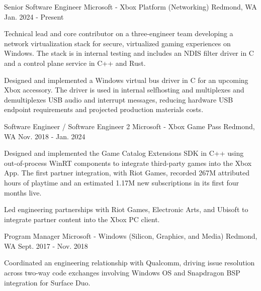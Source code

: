 

\begin{cventries}

  \cventry
    {Senior Software Engineer} %
    {Microsoft - Xbox Platform (Networking)} %
    {Redmond, WA} %
    {Jan. 2024 - Present} %
    {
      \begin{cvitems}
        \item{Technical lead and core contributor on a three-engineer team developing a network virtualization stack for secure, virtualized gaming experiences on Windows. The stack is in internal testing and includes an NDIS filter driver in C and a control plane service in C++ and Rust.}
        \item{Designed and implemented a Windows virtual bus driver in C for an upcoming Xbox accessory. The driver is used in internal selfhosting and multiplexes and demultiplexes USB audio and interrupt messages, reducing hardware USB endpoint requirements and projected production materials costs.}
      \end{cvitems}
    }

  \cventry
    {Software Engineer / Software Engineer 2} %
    {Microsoft - Xbox Game Pass} %
    {Redmond, WA} %
    {Nov. 2018 - Jan. 2024} %
    {
      \begin{cvitems}
        \item{Designed and implemented the Game Catalog Extensions SDK in C++ using out-of-process WinRT components to integrate third-party games into the Xbox App. The first partner integration, with Riot Games, recorded 267M attributed hours of playtime and an estimated 1.17M new subscriptions in its first four months live.}
        \item{Led engineering partnerships with Riot Games, Electronic Arts, and Ubisoft to integrate partner content into the Xbox PC client.}
      \end{cvitems}
    }

  \cventry
    {Program Manager} %
    {Microsoft - Windows (Silicon, Graphics, and Media)} %
    {Redmond, WA} %
    {Sept. 2017 - Nov. 2018} %
    {
      \begin{cvitems} %
        \item{Coordinated an engineering relationship with Qualcomm, driving issue resolution across two-way code exchanges involving Windows OS and Snapdragon BSP integration for Surface Duo.}
      \end{cvitems}
    }

\end{cventries}
